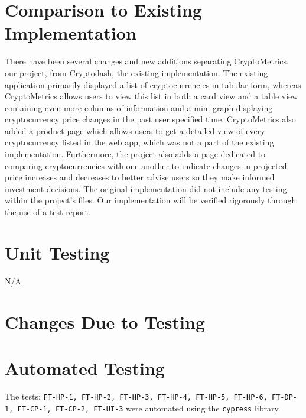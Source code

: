 \documentclass[12pt, titlepage]{article}
\begin{document}
\section{Comparison to Existing Implementation}	

There have been several changes and new additions separating CryptoMetrics, our project, from Cryptodash, the existing implementation. The existing application primarily displayed a list of cryptocurrencies in tabular form, whereas CryptoMetrics allows users to view this list in both a card view and a table view containing even more columns of information and a mini graph displaying cryptocurrency price changes in the past user specified time. CryptoMetrics also added a product page which allows users to get a detailed view of every cryptocurrency listed in the web app, which was not a part of the existing implementation. Furthermore, the project also adds a page dedicated to comparing cryptocurrencies with one another to indicate changes in projected price increases and decreases to better advise users so they make informed investment decisions. The original implementation did not include any testing within the project's files. Our implementation will be verified rigorously through the use of a test report.

\section{Unit Testing}
N/A
\section{Changes Due to Testing}

\section{Automated Testing}
The tests: \texttt{FT-HP-1, FT-HP-2, FT-HP-3, FT-HP-4, FT-HP-5, FT-HP-6, FT-DP-1, FT-CP-1, FT-CP-2, FT-UI-3} were automated using the \texttt{cypress} library.
		
\end{document}
